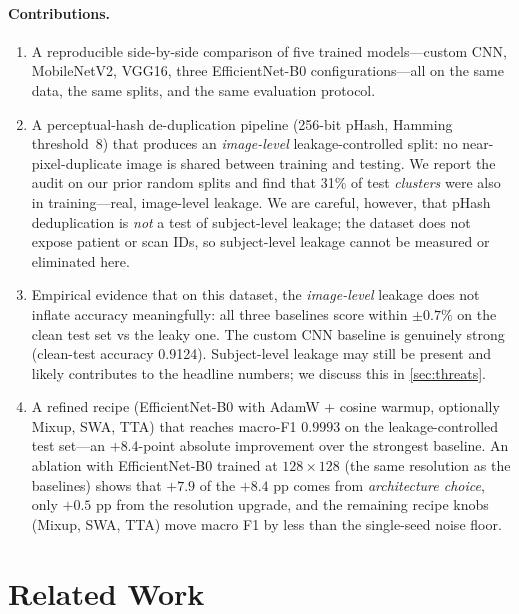 \documentclass[journal,onecolumn,11pt]{IEEEtran}
\begin{document}
\paragraph{Contributions.}
\begin{enumerate}[leftmargin=*,itemsep=2pt,topsep=2pt]
  \item A reproducible side-by-side comparison of five trained models---custom
    CNN, MobileNetV2, VGG16, three EfficientNet-B0 configurations---all on
    the same data, the same splits, and the same evaluation protocol.
  \item A perceptual-hash de-duplication pipeline (256-bit pHash, Hamming
    threshold~8) that produces an \emph{image-level} leakage-controlled split:
    no near-pixel-duplicate image is shared between training and testing.
    We report the audit on our prior random splits and find that 31\% of test
    \emph{clusters} were also in training---real, image-level leakage. We are
    careful, however, that pHash deduplication is \emph{not} a test of
    subject-level leakage; the dataset does not expose patient or scan IDs,
    so subject-level leakage cannot be measured or eliminated here.
  \item Empirical evidence that on this dataset, the \emph{image-level}
    leakage does not inflate accuracy meaningfully: all three baselines
    score within $\pm 0.7\%$ on the clean test set vs the leaky one.
    The custom CNN baseline is genuinely strong (clean-test accuracy
    0.9124). Subject-level leakage may still be present and likely
    contributes to the headline numbers; we discuss this in
    \cref{sec:threats}.
  \item A refined recipe (EfficientNet-B0 with AdamW + cosine warmup,
    optionally Mixup, SWA, TTA) that reaches macro-F1 $\mathbf{0.9993}$ on
    the leakage-controlled test set---an $+8.4$-point absolute improvement
    over the strongest baseline. An ablation with EfficientNet-B0 trained
    at $128{\times}128$ (the same resolution as the baselines) shows that
    $+7.9$ of the $+8.4$ pp comes from \emph{architecture choice}, only
    $+0.5$ pp from the resolution upgrade, and the remaining recipe knobs
    (Mixup, SWA, TTA) move macro F1 by less than the single-seed noise
    floor.
\end{enumerate}

\section{Related Work}
\label{sec:related}
\end{document}
